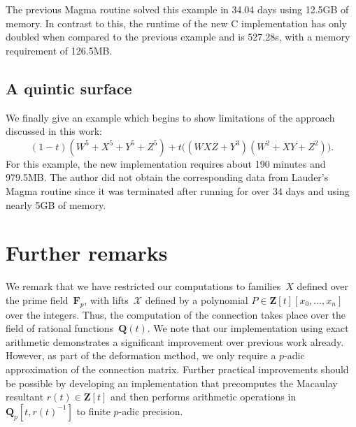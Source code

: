 The previous {\sc Magma} routine solved this example in 34.04 days using 
12.5GB of memory.  In contrast to this, the runtime of the new C 
implementation has only doubled when compared to the previous example and is 
527.28s, with a memory requirement of 126.5MB.

\subsection{A quintic surface}

We finally give an example which begins to show limitations of the approach 
discussed in this work:
\begin{equation*}
(1-t) (W^5 + X^5 + Y^5 + Z^5) + t \bigl((W X Z + Y^3) (W^2 + X Y + Z^2)\bigr).
\end{equation*}
For this example, the new implementation requires about 190 minutes and 
979.5MB.  The author did not obtain the corresponding data from Lauder's 
{\sc Magma} routine since it was terminated after running for over 34 days and 
using nearly 5GB of memory.


\section{Further remarks}

We remark that we have restricted our computations to families~$X$ 
defined over the prime field~$\mathbf{F}_p$, with lifts~$\mathcal{X}$ 
defined by a polynomial $P \in \mathbf{Z}[t][x_0,\dotsc,x_n]$ over 
the integers.  Thus, the computation of the connection takes place 
over the field of rational functions~$\mathbf{Q}(t)$.  We note that 
our implementation using exact arithmetic demonstrates a significant 
improvement over previous work already.  However, as part of the 
deformation method, we only require a $p$-adic approximation of the 
connection matrix.  Further practical improvements should be possible 
by developing an implementation that precomputes the Macaulay resultant 
$r(t) \in \mathbf{Z}[t]$ and then performs arithmetic operations 
in~$\mathbf{Q}_p[t, r(t)^{-1}]$ to finite $p$-adic precision.

